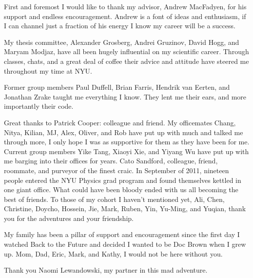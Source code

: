 First and foremost I would like to thank my advisor, Andrew MacFadyen, for his support and endless encouragement.  Andrew is a font of ideas and enthusiasm, if I can channel just a fraction of his energy I know my career will be a success.

My thesis committee, Alexander Grosberg, Andrei Gruzinov, David Hogg, and Maryam Modjaz, have all been hugely influential on my scientific career.  Through classes, chats, and a great deal of coffee their advice and attitude have steered me throughout my time at NYU.  

Former group members Paul Duffell, Brian Farris, Hendrik van Eerten, and Jonathan Zrake taught me everything I know.  They lent me their ears, and more importantly their code. 

Great thanks to Patrick Cooper: colleague and friend.  My officemates Chang, Nitya, Kilian, MJ, Alex, Oliver, and Rob have put up with much and talked me through more, I only hope I was as supportive for them as they have been for me.  Current group members Yike Tang, Xiaoyi Xie, and Yiyang Wu have put up with me barging into their offices for years.  Cato Sandford, colleague, friend, roommate, and purveyor of the finest craic. In September of 2011, nineteen people entered the NYU Physics grad program and found themselves kettled in one giant office.  What could have been bloody ended with us all becoming the best of friends.  To those of my cohort I haven't mentioned yet, Ali, Chen, Christine, Doycho, Hossein, Jie, Mark, Ruben, Yin, Yu-Ming, and Yuqian, thank you for the adventures and your friendship.

My family has been a pillar of support and encouragement since the first day I watched Back to the Future and decided I wanted to be Doc Brown when I grew up.  Mom, Dad, Eric, Mark, and Kathy, I would not be here without you.  

Thank you Naomi Lewandowski, my partner in this mad adventure.